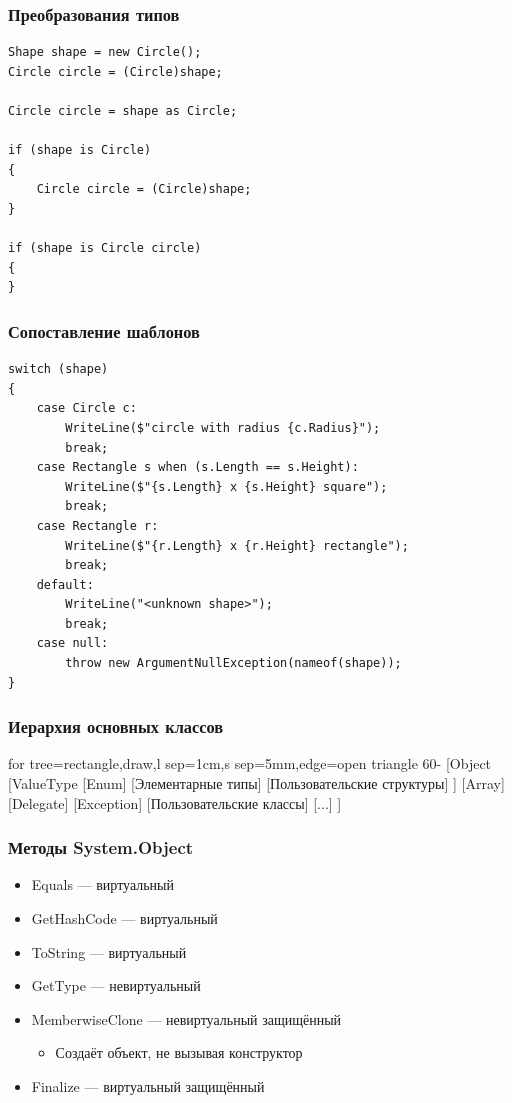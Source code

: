 \documentclass[xetex,mathserif,serif]{beamer}
\begin{document}
	\begin{frame}[fragile]
		\frametitle{Преобразования типов}
		\begin{verbatim}
Shape shape = new Circle();
Circle circle = (Circle)shape;

Circle circle = shape as Circle;

if (shape is Circle)
{
    Circle circle = (Circle)shape;
}

if (shape is Circle circle)
{
}
		\end{verbatim}
	\end{frame}

	\begin{frame}[fragile]
		\frametitle{Сопоставление шаблонов}
		\begin{small}
			\begin{verbatim}
switch (shape)
{
    case Circle c:
        WriteLine($"circle with radius {c.Radius}");
        break;
    case Rectangle s when (s.Length == s.Height):
        WriteLine($"{s.Length} x {s.Height} square");
        break;
    case Rectangle r:
        WriteLine($"{r.Length} x {r.Height} rectangle");
        break;
    default:
        WriteLine("<unknown shape>");
        break;
    case null:
        throw new ArgumentNullException(nameof(shape));
}
			\end{verbatim}
		\end{small}
\end{frame}

\begin{frame}
	\frametitle{Иерархия основных классов}
	\begin{tiny}
		\begin{forest}
			for tree={rectangle,draw,l sep=1cm,s sep=5mm,edge=open triangle 60-}
			[Object
				[ValueType
					[Enum]
					[Элементарные типы]
					[Пользовательские структуры]
				]
				[Array]
				[Delegate]
				[Exception]
				[Пользовательские классы]
				[...]
			]
		\end{forest}
	\end{tiny}
\end{frame}

\begin{frame}
	\frametitle{Методы System.Object}
	\begin{itemize}
		\item Equals --- виртуальный
		\item GetHashCode --- виртуальный
		\item ToString --- виртуальный
		\item GetType --- невиртуальный
		\item MemberwiseClone --- невиртуальный защищённый
		\begin{itemize}
			\item Создаёт объект, не вызывая конструктор
		\end{itemize}
		\item Finalize --- виртуальный защищённый
	\end{itemize}
\end{frame}
\end{document}
